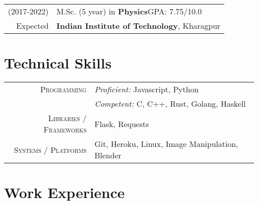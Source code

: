\documentclass[a4paper,12pt]{extarticle} %
\let\oldtextbf\textbf
\renewcommand{\textbf}[1]{\textcolor{bold}{\oldtextbf{#1}}}
\begin{document}
\begin{tabular}{r|p{15.7cm}}
\textsc{(2017-2022)} & M.Sc. (5 year) in \textbf{Physics}\hfill\textsc{GPA}: 7.75/10.0\\
Expected &\textbf{Indian Institute of Technology}, Kharagpur\\
\end{tabular}


\vspace{0.5cm}



\section{\textcolor{primary}{Technical Skills}}

\begin{tabular}{r|p{13cm}}
\textsc{Programming} & \textit{Proficient:} Javascript, Python\\
& \textit{Competent:} C, C++, Rust, Golang, Haskell \\
\textsc{Libraries / Frameworks} & Flask, Requests\\
\textsc{Systems / Platforms} & Git, Heroku, Linux, Image Manipulation, Blender\\
\end{tabular}

\vspace{0.25cm}




\section{\textcolor{primary}{Work Experience}}
\end{document}
